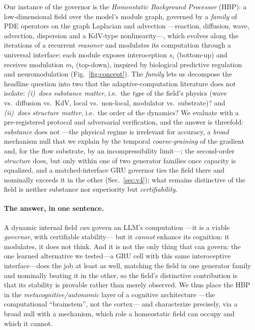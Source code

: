 \documentclass{article}
\begin{document}
Our instance of the governor is the \emph{Homeostatic Background Processor}
(HBP): a low-dimensional field over the model's module graph, governed by a
\emph{family} of PDE operators on the graph Laplacian and advection ---reaction,
diffusion, wave, advection, dispersion and a KdV-type nonlinearity---, which
evolves along the iterations of a recurrent \emph{reasoner} and modulates its
computation through a universal interface: each module exposes interoception
$s_i$ (bottom-up) and receives modulation $m_i$ (top-down), inspired by
biological predictive regulation and neuromodulation
\citep{sterling2012allostasis,barrett2017allostasis,friston2010free,
doya2002metalearning,vecoven2020neuromodulation}
(Fig.~\ref{fig:concept}). The \emph{family} lets us decompose the headline
question into two that the adaptive-computation literature does not isolate:
\emph{(i)~does substance matter}, i.e.\ the \emph{type} of the field's physics
(wave vs.\ diffusion vs.\ KdV, local vs.\ non-local, modulator vs.\ substrate)?
and \emph{(ii)~does structure matter}, i.e.\ the order of the dynamics? We
evaluate with a pre-registered protocol and adversarial verification, and the
answer is threefold: \emph{substance} does not ---the physical regime is
irrelevant for accuracy, a \emph{broad} mechanism null that we explain by
the temporal \emph{coarse-graining} of the gradient and, for the flow substrate,
by an incompressibility limit---; the second-order \emph{structure} does, but
only within one of two generator families once capacity is equalized, and a
matched-interface GRU governor ties the field there and nominally exceeds it
in the other
(Sec.~\ref{sec:v4}); what remains distinctive of the field is neither
substance nor superiority but \emph{certifiability}.

\paragraph{The answer, in one sentence.} A dynamic internal field \emph{can}
govern an LLM's computation ---it is a viable \emph{governor}, with certifiable
stability--- but it \emph{cannot} enhance its cognition: it modulates, it does
not think. And it is not the only thing that can govern: the one learned
alternative we tested---a GRU cell with this same interoceptive
interface---does the job at least as well, matching the field in one generator
family and nominally beating it in the other, so
the field's distinctive contribution is that its stability is provable rather
than merely observed. We thus place
the HBP in the \emph{metacognitive/autonomic} layer of a cognitive architecture
---the computational ``brainstem'', not the cortex--- and characterize
precisely, via a broad null with a mechanism, which role a homeostatic
field can occupy and which it cannot.
\end{document}
